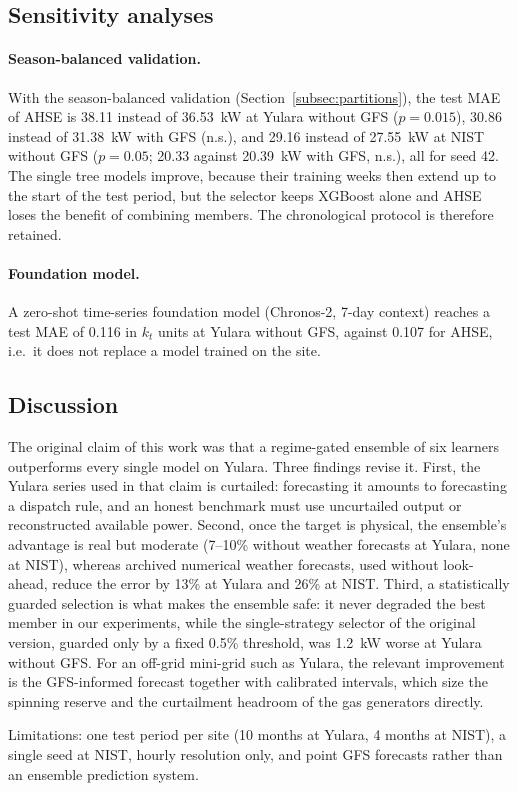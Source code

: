 \subsection{Sensitivity analyses}
\label{subsec:res_sensitivity}

\paragraph{Season-balanced validation.}
With the season-balanced validation (Section~\ref{subsec:partitions}), the test MAE of AHSE is
38.11 instead of 36.53~kW at Yulara without GFS ($p = 0.015$), 30.86 instead of 31.38~kW with GFS
(n.s.), and 29.16 instead of 27.55~kW at NIST without GFS ($p = 0.05$; 20.33 against 20.39~kW
with GFS, n.s.), all for seed 42. The single tree models improve, because their training weeks
then extend up to the start of the test period, but the selector keeps XGBoost alone and AHSE
loses the benefit of combining members. The chronological protocol is therefore retained.

\paragraph{Foundation model.}
A zero-shot time-series foundation model (Chronos-2, 7-day context) reaches a test MAE of 0.116 in
$k_t$ units at Yulara without GFS, against 0.107 for AHSE, i.e.\ it does not replace a model
trained on the site.

\subsection{Discussion}
\label{subsec:discussion}

The original claim of this work was that a regime-gated ensemble of six learners outperforms
every single model on Yulara. Three findings revise it. First, the Yulara series used in that
claim is curtailed: forecasting it amounts to forecasting a dispatch rule, and an honest benchmark
must use uncurtailed output or reconstructed available power. Second, once the target is
physical, the ensemble's advantage is real but moderate (7--10\% without weather forecasts at
Yulara, none at NIST), whereas archived numerical weather forecasts, used without look-ahead,
reduce the error by 13\% at Yulara and 26\% at NIST. Third, a statistically guarded selection is
what makes the ensemble safe: it never degraded the best member in our experiments, while the
single-strategy selector of the original version, guarded only by a fixed 0.5\% threshold, was
1.2~kW worse at Yulara without GFS. For an off-grid
mini-grid such as Yulara, the relevant improvement is the GFS-informed forecast together with
calibrated intervals, which size the spinning reserve and the curtailment headroom of the gas
generators directly.

Limitations: one test period per site (10 months at Yulara, 4 months at NIST), a single seed at
NIST, hourly resolution only, and point GFS forecasts rather than an ensemble prediction system.
